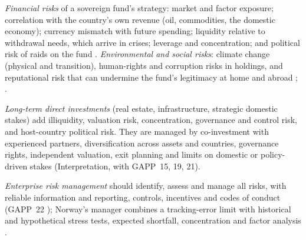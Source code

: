 \begin{qfmethod}\label{meth:swf-risk-case}
 \emph{Financial risks} of a sovereign fund's strategy: market and factor exposure; correlation with the country's own revenue (oil, commodities, the domestic economy); currency mismatch with future spending; liquidity relative to withdrawal needs, which arrive in crises; leverage and concentration; and political risk of raids on the fund \citep[chap.~1, pp.~7--12]{s7-ang}. \emph{Environmental and social risks}: climate change (physical and transition), human-rights and corruption risks in holdings, and reputational risk that can undermine the fund's legitimacy at home and abroad \citep[chap.~3, pp.~71--73]{s7-ang}; \citep[climate action plan]{nbim-gpfg-2026}.

\emph{Long-term direct investments} (real estate, infrastructure, strategic domestic stakes) add illiquidity, valuation risk, concentration, governance and control risk, and host-country political risk. They are managed by co-investment with experienced partners, diversification across assets and countries, governance rights, independent valuation, exit planning and limits on domestic or policy-driven stakes (Interpretation, with GAPP~15, 19, 21).

\emph{Enterprise risk management} should identify, assess and manage all risks, with reliable information and reporting, controls, incentives and codes of conduct (GAPP~22 \citep[GAPP~22]{santiago-principles-2008}); Norway's manager combines a tracking-error limit with historical and hypothetical stress tests, expected shortfall, concentration and factor analysis \citep[risk management]{nbim-gpfg-2026}.


\end{qfmethod}
